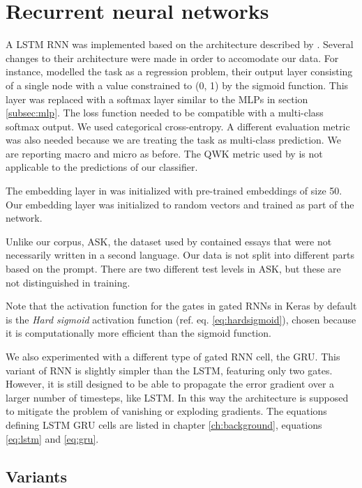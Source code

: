\section{Recurrent neural networks}

A \ac{LSTM} \ac{RNN} was implemented based on the architecture described by
\textcite{taghipour16}. Several changes to their architecture were made in
order to accomodate our data. For instance, \citeauthor{taghipour16} modelled
the task as a regression problem, their output layer consisting of a single
node with a value constrained to (0, 1) by the sigmoid function. This layer
was replaced with a softmax layer similar to the \acp{MLP} in section
\ref{subsec:mlp}. The loss function needed to be compatible with a
multi-class softmax output. We used categorical cross-entropy. A different
evaluation metric was also needed because we are treating the task as
multi-class prediction. We are reporting macro and micro \FI as before. The
\ac{QWK} metric used by \citeauthor{taghipour16} is not applicable to the
predictions of our classifier.

The embedding layer in \textcite{taghipour16} was initialized with
pre-trained embeddings of size 50. Our embedding layer was initialized to
random vectors and trained as part of the network.

Unlike our corpus, ASK, the dataset used by \citeauthor{taghipour16}
contained essays that were not necessarily written in a second language. Our
data is not split into different parts based on the prompt. There are two
different test levels in ASK, but these are not distinguished in training.

Note that the activation function for the gates in gated RNNs in Keras by
default is the \emph{Hard sigmoid} activation function (ref. eq.
\ref{eq:hardsigmoid}), chosen because it is computationally more efficient
than the sigmoid function.

We also experimented with a different type of gated \ac{RNN} cell, the
\ac{GRU}. This variant of \ac{RNN} is slightly simpler than the \ac{LSTM},
featuring only two gates. However, it is still designed to be able to
propagate the error gradient over a larger number of timesteps, like
\ac{LSTM}. In this way the architecture is supposed to mitigate the problem
of vanishing or exploding gradients. The equations defining \ac{LSTM}
\ac{GRU} cells are listed in chapter \ref{ch:background}, equations
\ref{eq:lstm} and \ref{eq:gru}.


\subsection{Variants}


